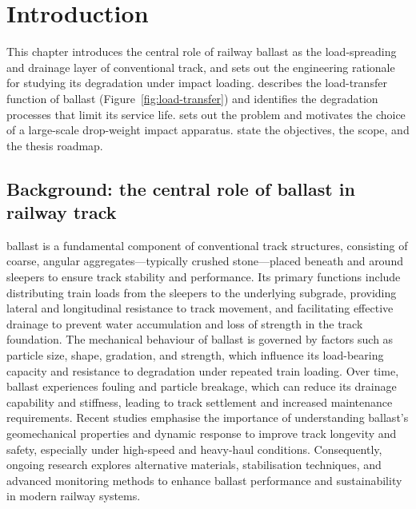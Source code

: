 \chapter{Introduction}
\label{chap:introduction}


\begin{chapterpreview}
This chapter introduces the central role of railway ballast as the
load-spreading and drainage layer of conventional track, and sets out
the engineering rationale for studying its degradation under impact
loading.  describes the load-transfer
function of ballast (Figure~\ref{fig:load-transfer}) and identifies the
degradation processes that limit its service life.
 sets out the problem and motivates the choice
of a large-scale drop-weight impact apparatus.
state the objectives, the scope, and the thesis roadmap.
\end{chapterpreview}

\section{Background: the central role of ballast in railway track}
\label{sec:intro-background}

 ballast is a fundamental component of conventional track structures,
consisting of coarse, angular aggregates---typically crushed stone---placed
beneath and around sleepers to ensure track stability and performance. Its
primary functions include distributing train loads from the sleepers to the
underlying subgrade, providing lateral and longitudinal resistance to track
movement, and facilitating effective drainage to prevent water accumulation
and loss of strength in the track foundation. The mechanical behaviour of
ballast is governed by factors such as particle size, shape, gradation, and
strength, which influence its load-bearing capacity and resistance to
degradation under repeated train loading. Over time, ballast experiences
fouling and particle breakage, which can reduce its drainage capability and
stiffness, leading to track settlement and increased maintenance
requirements. Recent studies emphasise the importance of understanding
ballast's geomechanical properties and dynamic response to improve track
longevity and safety, especially under high-speed and heavy-haul conditions.
Consequently, ongoing research explores alternative materials, stabilisation
techniques, and advanced monitoring methods to enhance ballast performance
and sustainability in modern railway systems.

